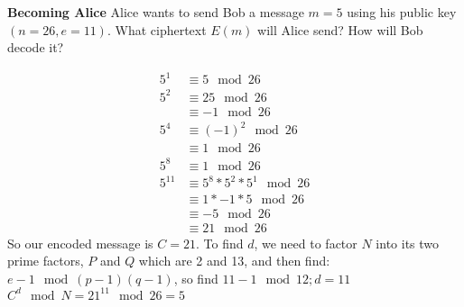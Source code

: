 \question \textbf{Becoming Alice}\newline
Alice wants to send Bob a message $m = 5$ using his public key $(n = 26, e = 11)$. What ciphertext $E(m)$ will Alice send? How will Bob decode it?
\begin{solution}
\begin{equation}
\begin{split}
5^1 	&\equiv 5 \mod 26 \\
5^2 	&\equiv 25 \mod 26 \\
	&\equiv -1 \mod 26 \\
5^4	&\equiv (-1)^2 \mod 26 \\
	&\equiv 1 \mod 26 \\
5^8 &	\equiv 1 \mod 26 \\
5^{11}	&\equiv 5^8 * 5^2 * 5^1 \mod 26 \\
	&\equiv 1 * -1 * 5 \mod 26 \\
	&\equiv -5 \mod 26 \\
	&\equiv 21 \mod 26
\end{split}
\end{equation}
So our encoded message is $C = 21$. To find $d$, we need to factor $N$ into its two prime factors, $P$ and $Q$ which are 2 and 13, and then find: 
$e-1 \mod (p-1)(q-1)$, so find $11-1 \mod 12; d = 11$
     $C^d \mod N = 21^{11} \mod 26 = 5$
\end{solution}